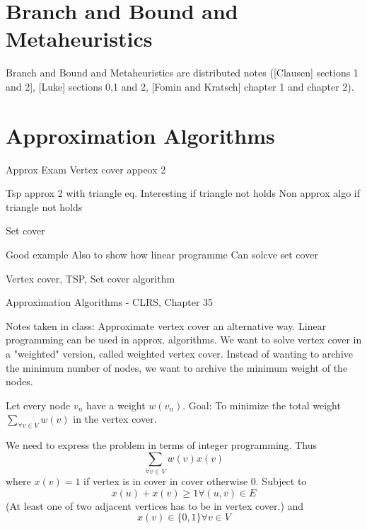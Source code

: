 \documentclass[10pt]{article}
\begin{document}

\section{Branch and Bound and Metaheuristics} %
\label{sec:branch_and_bound_and_metaheuristics}
Branch and Bound and Metaheuristics are  distributed notes ([Clausen] sections 1 and 2], [Luke] sections 0,1 and 2, [Fomin and Kratsch] chapter 1 and chapter 2).                                                                                                                                                          

\section{Approximation Algorithms} %
\label{sec:approximation_algorithms}


Approx Exam
Vertex cover appeox 2

Tsp approx 2 with triangle eq. Interesting if triangle not holds
Non approx algo if triangle not holds

Set cover

Good example Also to show how linear programme Can solcve set cover

Vertex cover, TSP, Set cover algorithm

Approximation Algorithms - CLRS, Chapter 35

Notes taken in class:
Approximate vertex cover an alternative way. Linear programming can be used in approx. algorithms. We want to solve vertex cover in a "weighted" version, called weighted vertex cover. Instead of wanting to archive the minimum number of nodes, we want to archive the minimum weight of the nodes.

Let every node $v_n$ have a weight $w(v_n)$. Goal: To minimize the total weight $\sum_{\forall v \in V} w(v)$ in the vertex cover. 


We need to express the problem in terms of integer programming. Thus
\begin{equation}
\sum_{\forall v \in V} w(v) x(v)  
\end{equation}
where $x(v)=1$ if vertex is in cover in cover otherwise 0. Subject to
\begin{equation}
  x(u)+x(v) \geq 1 \forall (u,v) \in E
\end{equation}
(At least one of two adjacent vertices has to be in vertex cover.) and
\begin{equation}
    x(v)  \in \{0,1\} \forall v \in V 
\end{equation}
\end{document}

